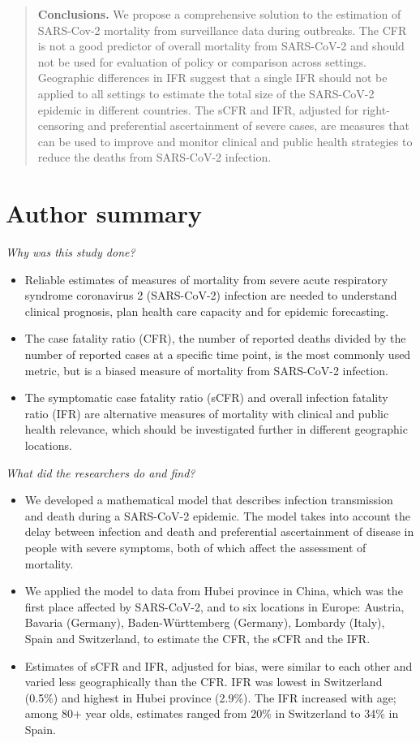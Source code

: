 \documentclass{article}
\begin{document}
\begin{abstract}
\textbf{Conclusions.} We propose a comprehensive solution to the estimation of SARS-Cov-2 mortality from surveillance data during outbreaks. The CFR is not a good predictor of overall mortality from SARS-CoV-2 and should not be used for evaluation of policy or comparison across settings. Geographic differences in IFR suggest that a single IFR should not be applied to all settings to estimate the total size of the SARS-CoV-2 epidemic in different countries. The sCFR and IFR, adjusted for right-censoring and preferential ascertainment of severe cases, are measures that can be used to improve and monitor clinical and public health strategies to reduce the deaths from SARS-CoV-2 infection.

\end{abstract}

\section*{Author summary}


\textit{Why was this study done?}
\begin{itemize}
	\item Reliable estimates of measures of mortality from severe acute respiratory syndrome coronavirus 2 (SARS-CoV-2) infection are needed to understand clinical prognosis, plan health care capacity and for epidemic forecasting.
	\item The case fatality ratio (CFR), the number of reported deaths divided by the number of reported cases at a specific time point, is the most commonly used metric, but is a biased measure of mortality from SARS-CoV-2 infection. 
	\item The symptomatic case fatality ratio (sCFR) and overall infection fatality ratio (IFR) are alternative measures of mortality with clinical and public health relevance, which should be investigated further in different geographic locations. 
\end{itemize}

\textit{What did the researchers do and find?}
\begin{itemize}
\item We developed a mathematical model that describes infection transmission and death during a SARS-CoV-2 epidemic. The model takes into account the delay between infection and death and preferential ascertainment of disease in people with severe symptoms, both of which affect the assessment of mortality.
\item We applied the model to data from Hubei province in China, which was the first place affected by SARS-CoV-2, and to six locations in Europe: Austria, Bavaria (Germany), Baden-Württemberg (Germany), Lombardy (Italy), Spain and Switzerland, to estimate the CFR, the sCFR and the IFR.
\item Estimates of sCFR and IFR, adjusted for bias, were similar to each other and varied less geographically than the CFR. IFR was lowest in Switzerland (0.5\%) and highest in Hubei province (2.9\%). The IFR increased with age; among 80+ year olds, estimates ranged from 20\% in Switzerland to 34\% in Spain.
\end{itemize}
\end{document}
